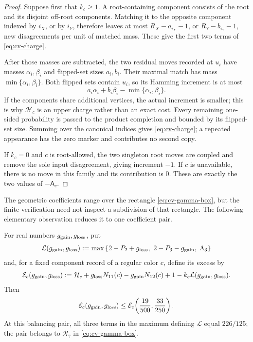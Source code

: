 \begin{proof}
Suppose first that \(k_c\ge1\).  A root-containing component consists of
the root and its disjoint off-root components.  Matching it to the
opposite component indexed by \(i_X\), or by \(i_Y\), therefore leaves at
most \(R_X-a_{i_X}-1\), or \(R_Y-b_{i_Y}-1\), new disagreements per unit
of matched mass.  These give the first two terms of
\eqref{eq:cv-charge}.

After those masses are subtracted, the two residual moves recorded at
\(u_i\) have masses \(\alpha_i,\beta_i\) and flipped-set sizes
\(a_i,b_i\).  Their maximal match has mass
\(\min\{\alpha_i,\beta_i\}\).  Both flipped sets contain \(u_i\), so its
Hamming increment is at most
\[
 a_i\alpha_i+b_i\beta_i-\min\{\alpha_i,\beta_i\}.
\]
If the components share additional vertices, the actual increment is
smaller; this is why \(\mathcal H_c\) is an upper charge rather than an
exact cost.  Every remaining one-sided probability is passed to the
product completion and bounded by its flipped-set size.  Summing over the
canonical indices gives \eqref{eq:cv-charge}; a repeated appearance has
the zero marker and contributes no second copy.

If \(k_c=0\) and \(c\) is root-allowed, the two singleton root
moves are coupled and remove the sole input disagreement, giving
increment \(-1\).  If \(c\) is unavailable, there is no move in this
family and its contribution is \(0\).  These are exactly the two values
of \(-\mathsf A_c\).
\end{proof}

The geometric coefficients range over the rectangle
\eqref{eq:cv-gamma-box}, but the finite verification need not inspect a
subdivision of that rectangle.  The following elementary observation
reduces it to one coefficient pair.

\begin{lemma}\label{lem:cv-balancing-domination}
For real numbers $g_{\rm gain},g_{\rm loss}$, put
\[
 \mathcal L(g_{\rm gain},g_{\rm loss}):=
 \max\left\{2-P_2+g_{\rm loss},\ 2-P_3-g_{\rm gain},\ \Lambda_3\right\}
\]
and, for a fixed component record of a regular color \(c\), define its
excess by
\[
 \mathcal E_c(g_{\rm gain},g_{\rm loss}):=
 \mathcal H_c+g_{\rm loss}N_{11}(c)-g_{\rm gain}N_{12}(c)
       +1-k_c\mathcal L(g_{\rm gain},g_{\rm loss}).
\]
Then
\[
 \mathcal E_c(g_{\rm gain},g_{\rm loss})
 \le \mathcal E_c\!\left(\frac{19}{500},\frac{33}{250}\right).
\]
At this balancing pair, all three terms in the maximum defining
$\mathcal L$ equal $226/125$; the pair belongs to
$\mathcal R_\gamma$ in \eqref{eq:cv-gamma-box}.
\end{lemma}

